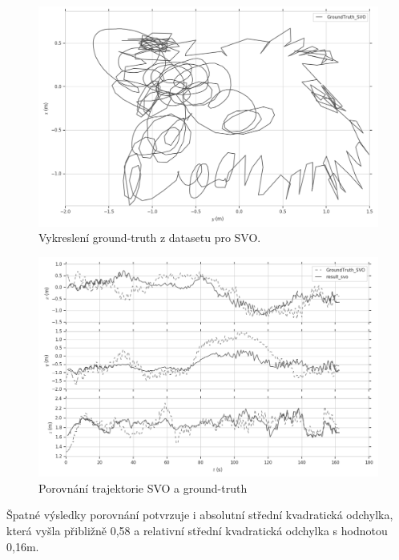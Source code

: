 \documentclass[12pt,a4paper]{report}
\begin{document}
\begin{figure}[H]
\centering
\includegraphics[scale=0.5]{img/xy_SVO_gt.png}
\caption{Vykreslení ground-truth z datasetu pro SVO.}
\label{11}
\end{figure}

\begin{figure}[H]
\centering
\includegraphics[scale=0.5]{img/xyz_SVO.png}
\caption{Porovnání trajektorie SVO a ground-truth}
\label{12}
\end{figure} 

Špatné výsledky porovnání potvrzuje i absolutní střední kvadratická odchylka, která vyšla přibližně 0,58 a relativní střední kvadratická odchylka s hodnotou 0,16m.
\end{document}
